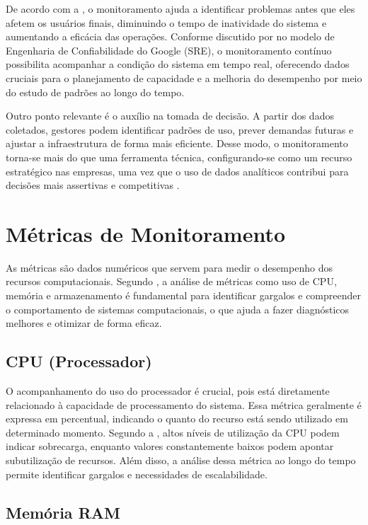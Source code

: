 \documentclass[
    12pt
    ,oneside
    ,a4paper
    ,chapter=TITLE
    ,section=TITLE
    ,sumario=abnt-6027-2012]{abntex2}
\begin{document}
De acordo com a , o monitoramento ajuda a identificar problemas antes que eles afetem os usuários finais, diminuindo o tempo de inatividade do sistema e aumentando a eficácia das operações. Conforme discutido por  no modelo de Engenharia de Confiabilidade do Google (SRE), o monitoramento contínuo possibilita acompanhar a condição do sistema em tempo real, oferecendo dados cruciais para o planejamento de capacidade e a melhoria do desempenho por meio do estudo de padrões ao longo do tempo.

Outro ponto relevante é o auxílio na tomada de decisão. A partir dos dados coletados, gestores podem identificar padrões de uso, prever demandas futuras e ajustar a infraestrutura de forma mais eficiente. Desse modo, o monitoramento torna-se mais do que uma ferramenta técnica, configurando-se como um recurso estratégico nas empresas, uma vez que o uso de dados analíticos contribui para decisões mais assertivas e competitivas \cite{davenport2006competing}.

\section{Métricas de Monitoramento}

As métricas são dados numéricos que servem para medir o desempenho dos recursos computacionais. Segundo , a análise de métricas como uso de CPU, memória e armazenamento é fundamental para identificar gargalos e compreender o comportamento de sistemas computacionais, o que ajuda a fazer diagnósticos melhores e otimizar de forma eficaz.

\subsection{CPU (Processador)}

O acompanhamento do uso do processador é crucial, pois está diretamente relacionado à capacidade de processamento do sistema. Essa métrica geralmente é expressa em percentual, indicando o quanto do recurso está sendo utilizado em determinado momento. Segundo a , altos níveis de utilização da CPU podem indicar sobrecarga, enquanto valores constantemente baixos podem apontar subutilização de recursos. Além disso, a análise dessa métrica ao longo do tempo permite identificar gargalos e necessidades de escalabilidade.

\subsection{Memória RAM}
\end{document}
